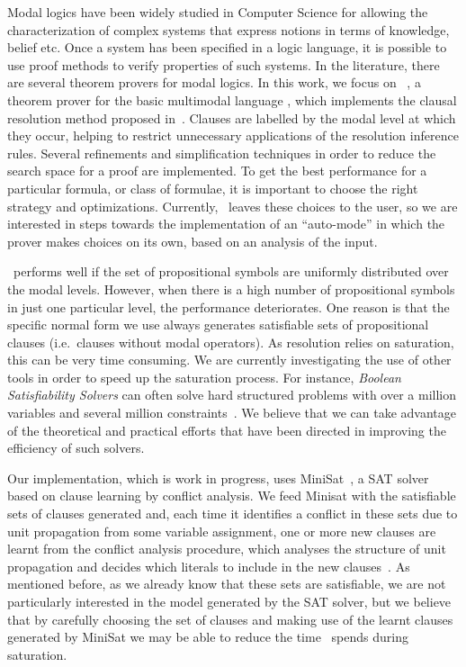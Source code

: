 Modal logics have been widely studied in Computer Science for allowing the
characterization of complex systems that express notions in terms of knowledge,
belief etc. Once a system has been specified in a logic language, it is possible
to use proof methods to verify properties of such systems. In the literature,
there are several theorem provers for modal logics.  In this work, we focus on
\ksp~\cite{Nalon2016}, a theorem prover for the basic multimodal language
, which implements the clausal resolution method proposed
in~\cite{nalon2015modal}.  Clauses are labelled by the modal level at which they
occur, helping to restrict unnecessary applications of the resolution inference
rules. Several refinements and simplification techniques in order to reduce the
search space for a proof are implemented. To get the best performance for a
particular formula, or class of formulae, it is important to choose the right
strategy and optimizations. Currently, \ksp~leaves these choices to the user, so
we are interested in steps towards the implementation of an ``auto-mode'' in
which the prover makes choices on its own, based on an analysis of the input.

\ksp~performs well if the set of propositional symbols are uniformly distributed
over the modal levels. However, when there is a high number of propositional
symbols in just one particular level, the performance deteriorates. One reason
is that the specific normal form we use always generates satisfiable sets of
propositional clauses (i.e.\ clauses without modal operators). As resolution
relies on saturation, this can be very time consuming. We are currently
investigating the use of other tools in order to speed up the saturation
process. For instance, \emph{Boolean Satisfiability Solvers} can often solve
hard structured problems with over a million variables and several million
constraints~\cite{satchapter}. We believe that we can take advantage of the
theoretical and practical efforts that have been directed in improving the
efficiency of such solvers. 

Our implementation, which is work in progress, uses MiniSat~\cite{minisat}, a
SAT solver based on clause learning by conflict analysis. We feed Minisat with
the satisfiable sets of clauses generated and, each time it
identifies a conflict in these sets due to unit propagation from some variable
assignment, one or more new clauses are learnt from the conflict analysis
procedure, which analyses the structure of unit propagation and decides which
literals to include in the new clauses~\cite{cdclchapter}. As mentioned before,
as we already know that these sets are satisfiable, we are not particularly
interested in the model generated by the SAT solver, but we believe that by
carefully choosing the set of clauses and making use of the learnt clauses
generated by MiniSat we may be able to reduce the time \ksp~spends during
saturation. 

